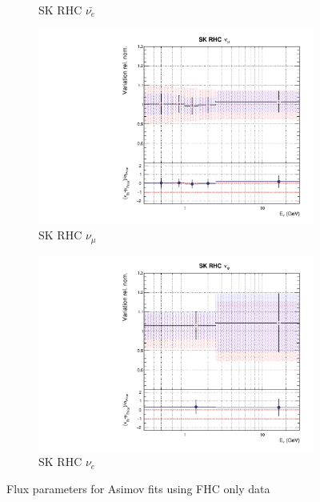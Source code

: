 \begin{figure}[t]
\begin{subfigure}{0.24\textwidth}
  \caption{SK RHC $\bar{\nu_e}$}
\end{subfigure}
\begin{subfigure}{0.24\textwidth}
  \centering
  \includegraphics[width=0.95\linewidth]{figs/rhcmpdat248flux_14}
  \caption{SK RHC $\nu_{\mu}$}
\end{subfigure}
\begin{subfigure}{0.24\textwidth}
  \centering
  \includegraphics[width=0.95\linewidth]{figs/rhcmpdat248flux_15}
  \caption{SK RHC $\nu_e$}
\end{subfigure}
\caption{Flux parameters for Asimov fits using FHC only data}
\label{fig:rhcmpidat248fluxSK}
\end{figure}

